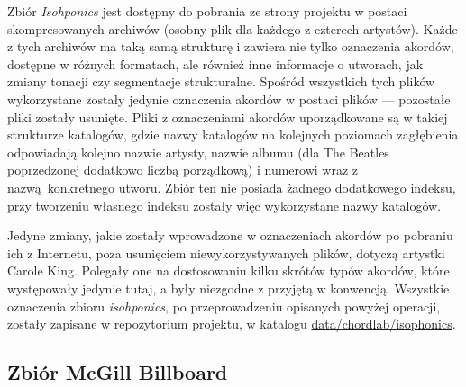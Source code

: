 Zbiór \emph{Isohponics} jest dostępny do pobrania ze strony projektu w postaci skompresowanych archiwów  (osobny plik dla każdego z czterech artystów). Każde z tych archiwów ma taką samą strukturę i zawiera nie tylko oznaczenia akordów, dostępne w różnych formatach, ale również inne informacje o utworach, jak zmiany tonacji czy segmentacje strukturalne. Spośród wszystkich tych plików wykorzystane zostały jedynie oznaczenia akordów w postaci plików  --- pozostałe pliki zostały usunięte. Pliki z oznaczeniami akordów uporządkowane są w takiej strukturze katalogów, gdzie nazwy katalogów na kolejnych poziomach zagłębienia odpowiadają kolejno nazwie artysty, nazwie albumu (dla The Beatles poprzedzonej dodatkowo liczbą porządkową) i numerowi wraz z nazwą konkretnego utworu. Zbiór ten nie posiada żadnego dodatkowego indeksu, przy tworzeniu własnego indeksu zostały więc wykorzystane nazwy katalogów.

Jedyne zmiany, jakie zostały wprowadzone w oznaczeniach akordów po pobraniu ich z Internetu, poza usunięciem niewykorzystywanych plików, dotyczą artystki Carole King. Polegały one na dostosowaniu kilku skrótów typów akordów, które występowały jedynie tutaj, a były niezgodne z przyjętą w \cite{harte_towards_nodate} konwencją. Wszystkie oznaczenia zbioru \emph{isohponics}, po przeprowadzeniu opisanych powyżej operacji, zostały zapisane w repozytorium projektu, w katalogu \url{data/chordlab/isophonics}.


\subsection{Zbiór McGill Billboard}

